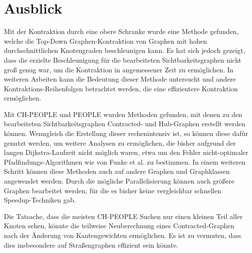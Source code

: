 \chapter{Ausblick}

Mit der Kontraktion durch eine obere Schranke wurde eine Methode gefunden, welche die Top-Down Graphen-Kontraktion von Graphen mit hohen durchschnittlichen Knotengraden beschleunigen kann.
Es hat sich jedoch gezeigt, dass die erzielte Beschleunigung für die bearbeiteten Sichtbarkeitsgraphen nicht groß genug war, um die Kontraktion in angemessener Zeit zu ermöglichen.
In weiteren Arbeiten kann die Bedeutung dieser Methode untersucht und andere Kontraktions-Reihenfolgen betrachtet werden, die eine effizientere Kontraktion ermöglichen.

Mit CH-PEOPLE und PEOPLE wurden Methoden gefunden, mit denen zu den bearbeiteten Sichtbarkeitsgraphen Contracted- und Hub-Graphen erstellt werden können.
Wenngleich die Erstellung dieser rechenintensiv ist, so können diese dafür genutzt werden, um weitere Analysen zu ermöglichen, die bisher aufgrund der langen Dijkstra-Laufzeit nicht möglich waren, etwa um den Fehler nicht-optimaler Pfadfindungs-Algorithmen wie von Funke et al. \cite{funkescalable} zu bestimmen.
In einem weiteren Schritt können diese Methoden auch auf andere Graphen und Graphklassen angewendet werden.
Durch die mögliche Parallelisierung können auch größere Graphen bearbeitet werden, für die es bisher keine vergleichbar schnellen Speedup-Techniken gab.

Die Tatsache, dass die meisten CH-PEOPLE Suchen nur einen kleinen Teil aller Knoten sehen, könnte die teilweise Neuberechnung eines Contracted-Graphen nach der Änderung von Kantengewichten ermöglichen.
Es ist zu vermuten, dass dies insbesondere auf Straßengraphen effizient sein könnte.
